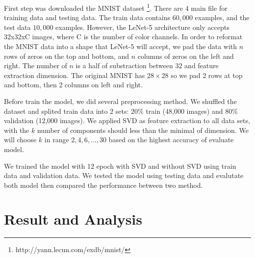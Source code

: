\documentclass[conference]{IEEEtran}
\begin{document}
First step was downloaded the MNIST dataset \footnote{http://yann.lecun.com/exdb/mnist/}. There are 4 main file for training data and testing data.
The train data contains $60,000$ examples, and the test data $10,000$ examples.
However, the LeNet-5 architecture only accepts 32x32xC images, where C is the number of color channels. 
In order to reformat the MNIST data into a shape that LeNet-5 will accept, we pad the data with $n$ rows of zeros on the top and bottom, and $n$ columns of zeros on the left and right. 
The number of $n$ is a half of substraction between $32$ and feature extraction dimension. The original MNIST has $28 \times 28$ so we pad 2 rows at top and bottom, then 2 columns on left and right.

Before train the model, we did several preprocessing method. We shuffled the dataset and splited train data into 2 sets: $20 \%$ train (48,000 images) and $80 \%$ validation (12,000 images).
We applied SVD as feature extraction to all data sets, with the $k$ number of components should less than the minimal of dimension. We will choose $k$ in range $2, 4, 6, ..., 30$ based on the highest accuracy of evaluate model.

We trained the model with 12 epoch with SVD and without SVD using train data and validation data. We tested the model using testing data and evalutate both model then compared the performance between two method.
\section{Result and Analysis}
\end{document}
